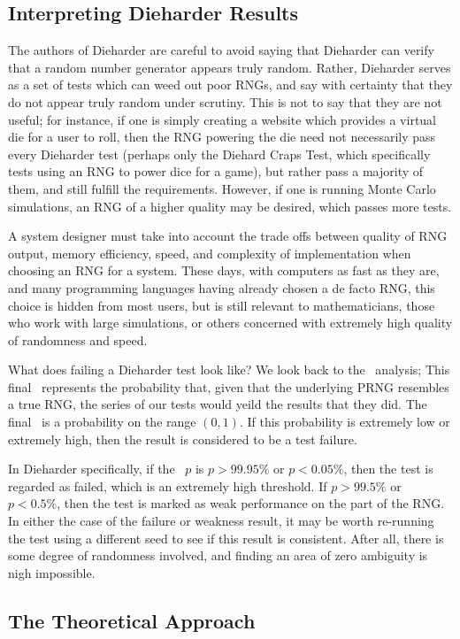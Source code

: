 \subsection{Interpreting Dieharder Results}
The authors of Dieharder are careful to avoid saying that Dieharder can verify that a random number generator appears truly random. Rather, Dieharder serves as a set of tests which can weed out poor RNGs, and say with certainty that they do not appear truly random under scrutiny. This is not to say that they are not useful; for instance, if one is simply creating a website which provides a virtual die for a user to roll, then the RNG powering the die need not necessarily pass every Dieharder test (perhaps only the Diehard Craps Test, which specifically tests using an RNG to power dice for a game), but rather pass a majority of them, and still fulfill the requirements. However, if one is running Monte Carlo simulations, an RNG of a higher quality may be desired, which passes more tests.

A system designer must take into account the trade offs between quality of RNG output, memory efficiency, speed, and complexity of implementation when choosing an RNG for a system. These days, with computers as fast as they are, and many programming languages having already chosen a de facto RNG, this choice is hidden from most users, but is still relevant to mathematicians, those who work with large simulations, or others concerned with extremely high quality of randomness and speed.

What does failing a Dieharder test look like? We look back to the \pvalue~analysis; This final \pvalue~represents the probability that, given that the underlying PRNG resembles a true RNG, the series of our tests would yeild the results that they did. The final \pvalue~is a probability on the range $(0,1)$. If this probability is extremely low or extremely high, then the result is considered to be a test failure.

In Dieharder specifically, if the \pvalue~$p$ is $p > 99.95 \%$ or $p < 0.05 \%$, then the test is regarded as failed, which is an extremely high threshold. If $p > 99.5 \%$ or $p < 0.5 \%$, then the test is marked as weak performance on the part of the RNG. In either the case of the failure or weakness result, it may be worth re-running the test using a different seed to see if this result is consistent. After all, there is some degree of randomness involved, and finding an area of zero ambiguity is nigh impossible.

\subsection{The Theoretical Approach}
\label{sec:theoretical}


